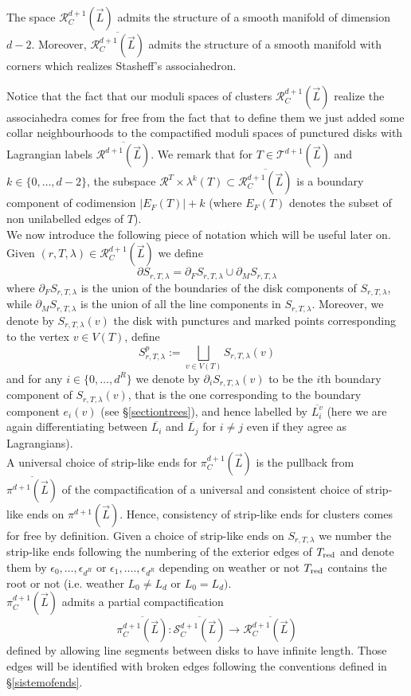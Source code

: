 \begin{lemma}\label{lemcluster}
	The space $\mathcal{R}^{d+1}_C(\vec{L})$ admits the structure of a smooth manifold of dimension $d-2$. Moreover, $\overline{\mathcal{R}^{d+1}_C(\vec{L})}$ admits the structure of a smooth manifold with corners which realizes Stasheff's associahedron.
\end{lemma}
\noindent Notice that the fact that our moduli spaces of clusters $\mathcal{R}^{d+1}_C(\vec{L})$ realize the associahedra comes for free from the fact that to define them we just added some collar neighbourhoods to the compactified moduli spaces of punctured disks with Lagrangian labels $\overline{\mathcal{R}^{d+1}(\vec{L})}$. We remark that for $T\in \mathcal{T}^{d+1}(\vec{L})$ and $k\in \{0,\ldots,d-2\}$, the subspace $\mathcal{R}^T\times \lambda^k(T)\subset \overline{\mathcal{R}^{d+1}_C(\vec{L})}$ is a boundary component of codimension $|E_F(T)|+k$ (where $E_F(T)$ denotes the subset of non unilabelled edges of $T$).\\


We now introduce the following piece of notation which will be useful later on. Given $(r,T,\lambda)\in \mathcal{R}^{d+1}_C(\vec{L})$ we define $$\partial S_{r,T,\lambda} = \partial_F S_{r,T,\lambda} \cup \partial_M S_{r,T,\lambda}$$ where $\partial_F S_{r,T,\lambda}$ is the union of the boundaries of the disk components of $S_{r,T,\lambda}$, while $\partial_MS_{r,T,\lambda}$ is the union of all the line components in $S_{r,T,\lambda}$. Moreover, we denote by $S_{r,T,\lambda}(v)$ the disk with punctures and marked points corresponding to the vertex $v\in V(T)$, define $$S_{r,T,\lambda}^p:=\bigsqcup_{v\in V(T)} S_{r,T,\lambda}(v)$$ and for any $i\in\{0,\ldots, d^R\}$ we denote by $\partial_iS_{r,T,\lambda}(v)$ to be the $i$th boundary component of $S_{r,T,\lambda}(v)$, that is the one corresponding to the boundary component $e_i(v)$ (see \S \ref{sectiontrees}), and hence labelled by $\overline{L^v_i}$ (here we are again differentiating between $\overline{L_i}$ and $\overline{L_j}$ for $i\neq j$ even if they agree as Lagrangians).\\
A universal choice of strip-like ends for $\pi^{d+1}_C(\vec{L})$ is the pullback from $\overline{\pi^{d+1}(\vec{L})}$ of the compactification of a universal and consistent choice of strip-like ends on $\pi^{d+1}(\vec{L})$. Hence, consistency of strip-like ends for clusters comes for free by definition. Given a choice of strip-like ends on $S_{r,T,\lambda}$ we number the strip-like ends following the numbering of the exterior edges of $T_\textnormal{red}$ and denote them by $\epsilon_0,\ldots,\epsilon_{d^R}$ or $\epsilon_1,\ldots.,\epsilon_{d^R}$ depending on weather or not $T_\textnormal{red}$ contains the root or not (i.e. weather $L_0\neq L_d$ or $L_0=L_d)$.\\
$\pi^{d+1}_C(\vec{L})$ admits a partial compactification $$\overline{\pi_C^{d+1}(\vec{L})}: \overline{\mathcal{S}_C^{d+1}(\vec{L})}\to \overline{\mathcal{R}_C^{d+1}(\vec{L})}$$ defined by allowing line segments between disks to have infinite length. Those edges will be identified with broken edges following the conventions defined in \S \ref{sistemofends}.\\


